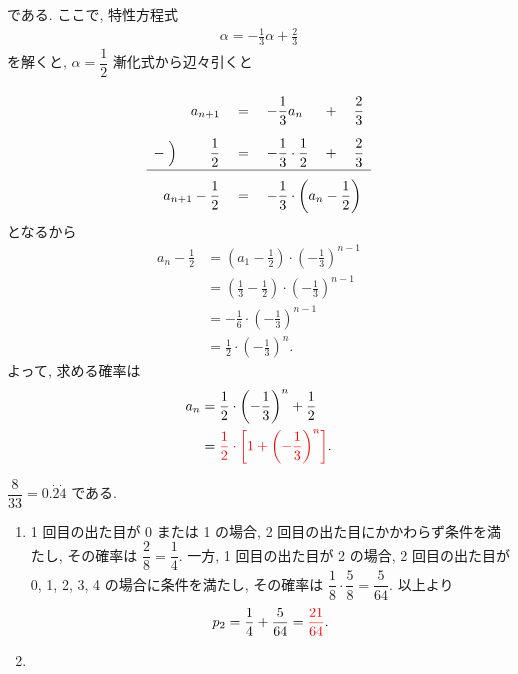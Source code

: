 \begin{qenumerate}
{		である.
		ここで, 特性方程式
		\begin{align}
			\alpha = -\frac{1}{3}\alpha + \frac{2}{3}
		\end{align}
		を解くと, $\alpha = \dfrac{1}{2}$
		漸化式から辺々引くと
		\begin{align}
			\def\arraystretch{2.5}
			\begin{array}{rrclcr}
				        & a_{n + 1}                          & {}={} & -\dfrac{1}{3}a_{n}                                  & {}+{} & \dfrac{2}{3} \\
				-\Bigm) & \dfrac{1}{2}                       & {}={} & -\dfrac{1}{3}\cdot\dfrac{1}{2}                      & {}+{} & \dfrac{2}{3} \\ \hline
				\multicolumn{2}{r}{a_{n + 1} - \dfrac{1}{2}} & {}={} & \multicolumn{3}{l}{-\dfrac{1}{3}\cdot\left(a_{n} - \dfrac{1}{2}\right)}
			\end{array}
		\end{align}
		となるから
		\begin{align}
			a_{n}-\frac{1}{2} &= \left(a_{1} - \frac{1}{2}\right)\cdot\left(-\frac{1}{3}\right)^{n - 1} \\
				&= \left(\frac{1}{3} - \frac{1}{2}\right)\cdot\left(-\frac{1}{3}\right)^{n - 1} \\
				&= -\frac{1}{6}\cdot\left(-\frac{1}{3}\right)^{n - 1} \\
				&= \frac{1}{2}\cdot\left(-\frac{1}{3}\right)^{n}.
		\end{align}
		よって, 求める確率は
		\begin{align}
			a_{n} &= \frac{1}{2}\cdot\left(-\frac{1}{3}\right)^{n} + \frac{1}{2} \\
				&= \textcolor{red}{\frac{1}{2}\cdot\left[1 + \left(-\frac{1}{3}\right)^{n}\right]}.
		\end{align}
	}
	\item{
		$\dfrac{8}{33} = 0.\dot{2}\dot{4}$ である.
		\begin{enumerate}
			\item{
				1 回目の出た目が 0 または 1 の場合, 2 回目の出た目にかかわらず条件を満たし, その確率は $\dfrac{2}{8} = \dfrac{1}{4}$.
				一方, 1 回目の出た目が 2 の場合, 2 回目の出た目が 0, 1, 2, 3, 4 の場合に条件を満たし, その確率は $\dfrac{1}{8}\cdot\dfrac{5}{8} = \dfrac{5}{64}$.
				以上より
				\begin{align}
					p_{2} = \frac{1}{4} + \frac{5}{64} = \textcolor{red}{\frac{21}{64}}.
				\end{align}
			}
			\item{
				\begin{enumerate}

\end{enumerate}}
\end{enumerate}}
\end{qenumerate}
